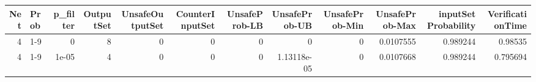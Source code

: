 \begin{tabular}{rlrrrrrrrrrr}
\hline
   Net & Prob   &   p\_filter &   OutputSet &   UnsafeOutputSet &   CounterInputSet &   UnsafeProb-LB &   UnsafeProb-UB &   UnsafeProb-Min &   UnsafeProb-Max &   inputSet Probability &   VerificationTime \\
\hline
     4 & 1-9    &      0     &           8 &                 0 &                 0 &               0 &     0           &                0 &        0.0107555 &               0.989244 &           0.98535  \\
     4 & 1-9    &      1e-05 &           4 &                 0 &                 0 &               0 &     1.13118e-05 &                0 &        0.0107668 &               0.989244 &           0.795694 \\
\hline
\end{tabular}
